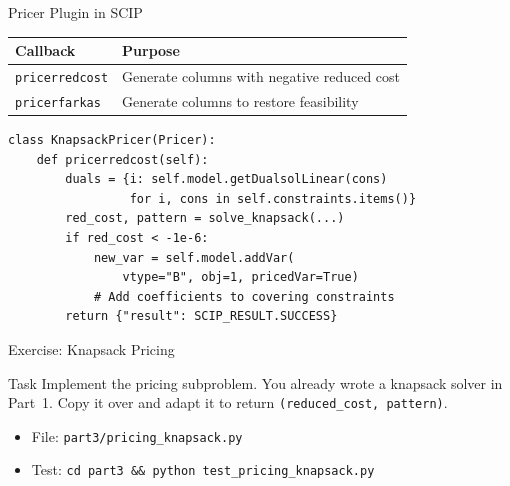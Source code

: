 \documentclass[aspectratio=169]{beamer}
\begin{document}
\begin{frame}[fragile]{Pricer Plugin in SCIP}
\begin{table}
\centering\small
\begin{tabular}{lp{8cm}}
\toprule
\textbf{Callback} & \textbf{Purpose} \\
\midrule
\texttt{pricerredcost} & Generate columns with negative reduced cost \\
\texttt{pricerfarkas}  & Generate columns to restore feasibility \\
\bottomrule
\end{tabular}
\end{table}

\medskip
\begin{lstlisting}
class KnapsackPricer(Pricer):
    def pricerredcost(self):
        duals = {i: self.model.getDualsolLinear(cons)
                 for i, cons in self.constraints.items()}
        red_cost, pattern = solve_knapsack(...)
        if red_cost < -1e-6:
            new_var = self.model.addVar(
                vtype="B", obj=1, pricedVar=True)
            # Add coefficients to covering constraints
        return {"result": SCIP_RESULT.SUCCESS}
\end{lstlisting}
\end{frame}

\begin{frame}{Exercise: Knapsack Pricing}
\begin{block}{Task}
Implement the pricing subproblem. You already wrote a knapsack solver in
Part~1. Copy it over and adapt it to return \texttt{(reduced\_cost, pattern)}.
\end{block}
\begin{itemize}
  \item File: \texttt{part3/pricing\_knapsack.py}
  \item Test: \texttt{cd part3 \&\& python test\_pricing\_knapsack.py}
\end{itemize}
\end{frame}
\end{document}
